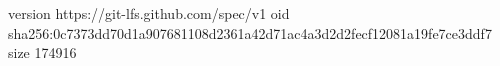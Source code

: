 version https://git-lfs.github.com/spec/v1
oid sha256:0c7373dd70d1a907681108d2361a42d71ac4a3d2d2fecf12081a19fe7ce3ddf7
size 174916
